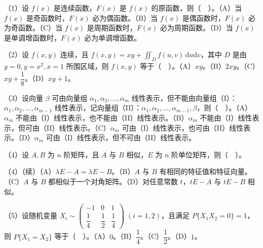 \documentclass[UTF8,12pt]{ctexart}
\begin{document}
（1）设 \(\displaystyle f(x)\) 是连续函数，\(\displaystyle F(x)\) 是 \(\displaystyle f(x)\) 的原函数，则（　）。（A）当 \(\displaystyle f(x)\) 是奇函数时，\(\displaystyle F(x)\) 必为偶函数。（B）当 \(\displaystyle f(x)\) 是偶函数时，\(\displaystyle F(x)\) 必为奇函数。（C）当 \(\displaystyle f(x)\) 是周期函数时，\(\displaystyle F(x)\) 必为周期函数。（D）当 \(\displaystyle f(x)\) 是单调增函数时，\(\displaystyle F(x)\) 必为单调增函数。


（2）设 \(\displaystyle f(x,\allowbreak y)\) 连续，且 \(\displaystyle f(x,\allowbreak y)=xy+\displaystyle \iint_D f(u,\allowbreak v)\,\mathrm du\mathrm dv\)，其中 \(\displaystyle D\) 是由 \(\displaystyle y=0,\allowbreak y=x^2,\allowbreak x=1\) 所围区域，则 \(\displaystyle f(x,\allowbreak y)\) 等于（　）。（A）\(\displaystyle xy\)。（B）\(\displaystyle 2xy\)。（C）\(\displaystyle xy+\dfrac{\displaystyle 1}{\displaystyle 8}\)。（D）\(\displaystyle xy+1\)。


（3）设向量 \(\displaystyle \beta\) 可由向量组 \(\displaystyle \alpha_1,\allowbreak \alpha_2,\allowbreak \ldots,\allowbreak \alpha_m\) 线性表示，但不能由向量组（I）：\(\displaystyle \alpha_1,\allowbreak \alpha_2,\allowbreak \ldots,\allowbreak \alpha_{m-1}\) 线性表示，记向量组（II）：\(\displaystyle \alpha_1,\allowbreak \alpha_2,\allowbreak \ldots,\allowbreak \alpha_{m-1},\allowbreak \beta\)，则（　）。（A）\(\displaystyle \alpha_m\) 不能由（I）线性表示，也不能由（II）线性表示。（B）\(\displaystyle \alpha_m\) 不能由（I）线性表示，但可由（II）线性表示。（C）\(\displaystyle \alpha_m\) 可由（I）线性表示，也可由（II）线性表示。（D）\(\displaystyle \alpha_m\) 可由（I）线性表示，但不可由（II）线性表示。


（4）设 \(\displaystyle A,\allowbreak B\) 为 \(\displaystyle n\) 阶矩阵，且 \(\displaystyle A\) 与 \(\displaystyle B\) 相似，\(\displaystyle E\) 为 \(\displaystyle n\) 阶单位矩阵，则（　）。


（4）（续）（A）\(\displaystyle \lambda E-A=\lambda E-B\)。（B）\(\displaystyle A\) 与 \(\displaystyle B\) 有相同的特征值和特征向量。（C）\(\displaystyle A\) 与 \(\displaystyle B\) 都相似于一个对角矩阵。（D）对任意常数 \(\displaystyle t\)，\(\displaystyle tE-A\) 与 \(\displaystyle tE-B\) 相似。


（5）设随机变量 \(\displaystyle X_i\sim\begin{pmatrix}-1&0&1\\\dfrac{\displaystyle 1}{\displaystyle 4}&\dfrac{\displaystyle 1}{\displaystyle 2}&\dfrac{\displaystyle 1}{\displaystyle 4}\end{pmatrix}\;(i=1,\allowbreak 2)\)，且满足 \(\displaystyle P\{X_1X_2=0\}=1\)，则 \(\displaystyle P\{X_1=X_2\}\) 等于（　）。（A）\(\displaystyle 0\)。（B）\(\displaystyle \dfrac{\displaystyle 1}{\displaystyle 4}\)。（C）\(\displaystyle \dfrac{\displaystyle 1}{\displaystyle 2}\)。（D）\(\displaystyle 1\)。
\end{document}
